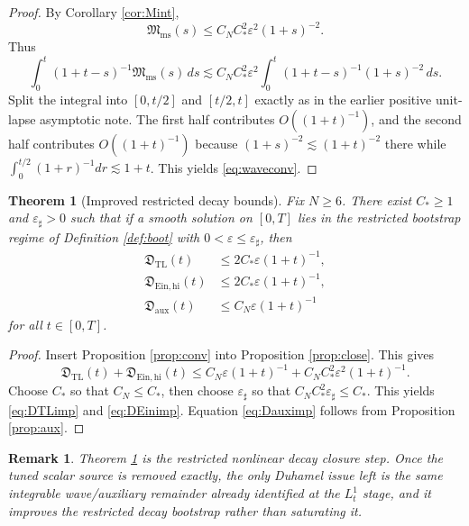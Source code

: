 \documentclass[11pt]{article}
\newtheorem{remark}{Remark}
\newtheorem{theorem}{Theorem}
\begin{document}
\begin{proof}
By Corollary \ref{cor:Mint},
\[
\mathfrak M_{\mathrm{ms}}(s)\le C_NC_\ast^2\varepsilon^2(1+s)^{-2}.
\]
Thus
\[
\int_0^t (1+t-s)^{-1}\mathfrak M_{\mathrm{ms}}(s)\,ds
\lesssim
C_NC_\ast^2\varepsilon^2
\int_0^t (1+t-s)^{-1}(1+s)^{-2}\,ds.
\]
Split the integral into \([0,t/2]\) and \([t/2,t]\) exactly as in the earlier positive unit-lapse asymptotic note. The first half contributes \(O((1+t)^{-1})\), and the second half contributes \(O((1+t)^{-1})\) because \((1+s)^{-2}\lesssim (1+t)^{-2}\) there while \(\int_0^{t/2}(1+r)^{-1}dr\lesssim 1+t\). This yields \eqref{eq:waveconv}.
\end{proof}

\begin{theorem}[Improved restricted decay bounds]
\label{thm:improve}
Fix \(N\ge 6\). There exist \(C_\ast\ge 1\) and \(\varepsilon_\sharp>0\) such that if a smooth solution on \([0,T]\) lies in the restricted bootstrap regime of Definition \ref{def:boot} with \(0<\varepsilon\le \varepsilon_\sharp\), then
\begin{align}
\mathfrak D_{\mathrm{TL}}(t)
&\le
2C_\ast\varepsilon(1+t)^{-1},
\label{eq:DTLimp}
\\
\mathfrak D_{\mathrm{Ein,hi}}(t)
&\le
2C_\ast\varepsilon(1+t)^{-1},
\label{eq:DEinimp}
\\
\mathfrak D_{\mathrm{aux}}(t)
&\le
C_N\varepsilon(1+t)^{-1}
\label{eq:Dauximp}
\end{align}
for all \(t\in[0,T]\).
\end{theorem}

\begin{proof}
Insert Proposition \ref{prop:conv} into Proposition \ref{prop:close}. This gives
\[
\mathfrak D_{\mathrm{TL}}(t)+\mathfrak D_{\mathrm{Ein,hi}}(t)
\le
C_N\varepsilon(1+t)^{-1}
+ C_NC_\ast^2\varepsilon^2(1+t)^{-1}.
\]
Choose \(C_\ast\) so that \(C_N\le C_\ast\), then choose \(\varepsilon_\sharp\) so that \(C_NC_\ast^2\varepsilon_\sharp\le C_\ast\). This yields \eqref{eq:DTLimp} and \eqref{eq:DEinimp}. Equation \eqref{eq:Dauximp} follows from Proposition \ref{prop:aux}.
\end{proof}

\begin{remark}
Theorem \ref{thm:improve} is the restricted nonlinear decay closure step. Once the tuned scalar source is removed exactly, the only Duhamel issue left is the same integrable wave/auxiliary remainder already identified at the \(L_t^1\) stage, and it improves the restricted decay bootstrap rather than saturating it.
\end{remark}
\end{document}
